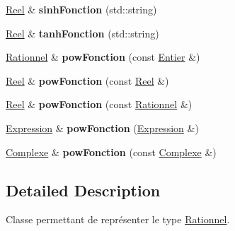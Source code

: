 \begin{DoxyCompactItemize}
\item 
\hypertarget{class_rationnel_ad1f0f97e8d1230fef3ee13007f2adad6}{\hyperlink{class_reel}{Reel} \& {\bfseries sinh\-Fonction} (std\-::string)}\label{class_rationnel_ad1f0f97e8d1230fef3ee13007f2adad6}

\item 
\hypertarget{class_rationnel_a71eeca7176e66eacc3feb01d9c8f3253}{\hyperlink{class_reel}{Reel} \& {\bfseries tanh\-Fonction} (std\-::string)}\label{class_rationnel_a71eeca7176e66eacc3feb01d9c8f3253}

\item 
\hypertarget{class_rationnel_a8a758cae4fed92ab8158152db4137340}{\hyperlink{class_rationnel}{Rationnel} \& {\bfseries pow\-Fonction} (const \hyperlink{class_entier}{Entier} \&)}\label{class_rationnel_a8a758cae4fed92ab8158152db4137340}

\item 
\hypertarget{class_rationnel_a8fc569b3d6aa463c76344956ffe8a609}{\hyperlink{class_reel}{Reel} \& {\bfseries pow\-Fonction} (const \hyperlink{class_reel}{Reel} \&)}\label{class_rationnel_a8fc569b3d6aa463c76344956ffe8a609}

\item 
\hypertarget{class_rationnel_abdcae693cd1aa76bf900ef89ac78c79c}{\hyperlink{class_reel}{Reel} \& {\bfseries pow\-Fonction} (const \hyperlink{class_rationnel}{Rationnel} \&)}\label{class_rationnel_abdcae693cd1aa76bf900ef89ac78c79c}

\item 
\hypertarget{class_rationnel_a47e42423967322a598cffa0e2dff4b6c}{\hyperlink{class_expression}{Expression} \& {\bfseries pow\-Fonction} (\hyperlink{class_expression}{Expression} \&)}\label{class_rationnel_a47e42423967322a598cffa0e2dff4b6c}

\item 
\hypertarget{class_rationnel_ad97076dea173603caed06561f332188d}{\hyperlink{class_complexe}{Complexe} \& {\bfseries pow\-Fonction} (const \hyperlink{class_complexe}{Complexe} \&)}\label{class_rationnel_ad97076dea173603caed06561f332188d}

\end{DoxyCompactItemize}


\subsection{Detailed Description}
Classe permettant de représenter le type \hyperlink{class_rationnel}{Rationnel}. 

